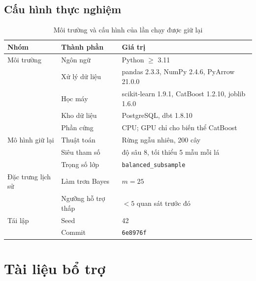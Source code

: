\documentclass[12pt,a4paper]{report}
\begin{document}
\section{Cấu hình thực nghiệm}\label{app:env}
\begin{table}[htbp]\centering\small
\caption{Môi trường và cấu hình của lần chạy được giữ lại}\label{tab:app-env}
\begin{tabular}{L{2.6cm}L{4.2cm}L{6.6cm}}
\toprule
Nhóm & Thành phần & Giá trị \\
\midrule
Môi trường & Ngôn ngữ & Python $\geq$ 3.11 \\
           & Xử lý dữ liệu & pandas 2.3.3, NumPy 2.4.6, PyArrow 21.0.0 \\
           & Học máy & scikit-learn 1.9.1, CatBoost 1.2.10, joblib 1.6.0 \\
           & Kho dữ liệu & PostgreSQL, dbt 1.8.10 \\
           & Phần cứng & CPU; GPU chỉ cho biến thể CatBoost \\
\midrule
Mô hình giữ lại & Thuật toán & Rừng ngẫu nhiên, 200 cây \\
           & Siêu tham số & độ sâu 8, tối thiểu 5 mẫu mỗi lá \\
           & Trọng số lớp & \texttt{balanced\_subsample} \\
\midrule
Đặc trưng lịch sử & Làm trơn Bayes & $m = 25$ \\
           & Ngưỡng hỗ trợ thấp & $< 5$ quan sát trước đó \\
\midrule
Tái lập    & Seed & 42 \\
           & Commit & \texttt{6e8976f} \\
\bottomrule
\end{tabular}
\end{table}
\chapter{Tài liệu bổ trợ}
\end{document}
